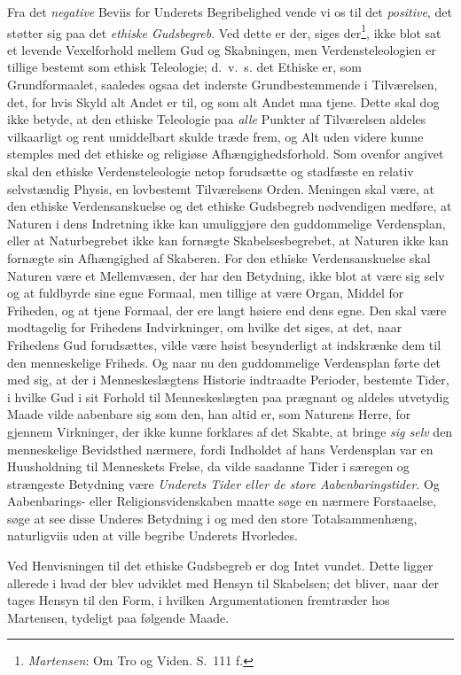 \documentclass[12pt,a4paper]{book}
\newcommand{\opage}[1]{\marginnote{\footnotesize\textit{[#1]}}}
\begin{document}
Fra det \emph{negative} Beviis for Underets Begribelighed vende vi os til det \emph{positive}, det støtter sig paa det \emph{ethiske Gudsbegreb}. Ved dette er der, siges
der\footnote{\emph{Martensen}: Om Tro og Viden. S.\ 111 f.}, ikke blot sat et levende
Vexelforhold mellem Gud og Skabningen, men Verdensteleologien er tillige bestemt som
ethisk Teleologie; d.\ v.\ s. det Ethiske er, som Grundformaalet, saaledes ogsaa det
inderste Grundbestemmende i Tilværelsen, det, for hvis Skyld alt Andet er til, og som alt
Andet maa tjene. Dette skal dog ikke betyde, at den ethiske Teleologie paa \emph{alle} Punkter
af Tilværelsen aldeles vilkaar\opage{86}ligt og rent umiddelbart skulde træde frem, og Alt uden
videre kunne stemples med det ethiske og religiøse Afhængighedsforhold. Som ovenfor
angivet skal den ethiske Verdensteleologie netop forudsætte og stadfæste en relativ
selvstændig Physis, en lovbestemt Tilværelsens Orden. Meningen skal være, at den ethiske
Verdensanskuelse og det ethiske Gudsbegreb nødvendigen medføre, at Naturen i dens
Indretning ikke kan umuliggjøre den guddommelige Verdensplan, eller at Naturbegrebet ikke
kan fornægte Skabelsesbegrebet, at Naturen ikke kan fornægte sin Afhængighed af Skaberen.
For den ethiske Verdensanskuelse skal Naturen være et Mellemvæsen, der har den Betydning,
ikke blot at være sig selv og at fuldbyrde sine egne Formaal, men tillige at være Organ,
Middel for Friheden, og at tjene Formaal, der ere langt høiere end dens egne. Den skal
være modtagelig for Frihedens Indvirkninger, om hvilke det siges, at det, naar Frihedens
Gud forudsættes, vilde være høist besynderligt at indskrænke dem til den menneskelige
Friheds. Og naar nu den guddommelige Verdensplan førte det med sig, at der i
Menneskeslægtens Historie indtraadte Perioder, bestemte Tider, i hvilke Gud i sit Forhold
til Menneskeslægten paa prægnant og aldeles utvetydig Maade vilde aabenbare sig som den,
han altid er, som Naturens Herre, for gjennem Virkninger, der ikke kunne forklares af det
Skabte, at bringe \emph{sig selv} den menneskelige Bevidsthed nærmere, fordi Indholdet af hans
Verdensplan var en Huusholdning til Menneskets Frelse, da vilde saadanne Tider i særegen
og strængeste Betydning være \emph{Underets Tider eller de store Aabenbaringstider}. Og
Aabenbarings- eller Religionsvidenskaben maatte søge en nærmere Forstaaelse, søge at see
disse Underes Betydning i og med den store Totalsammenhæng, naturligviis uden at ville
begribe Underets Hvorledes.

Ved Henvisningen til det ethiske Gudsbegreb er dog Intet vundet. Dette ligger allerede i
hvad der blev udviklet med Hensyn til Skabelsen; det bliver, naar der tages \opage{87}Hensyn til
den Form, i hvilken Argumentationen fremtræder hos Martensen, tydeligt paa følgende
Maade.
\end{document}
